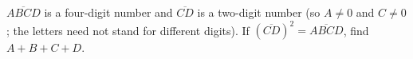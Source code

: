 $\overline{ABCD}$ is a four-digit number and $\overline{CD}$ is a two-digit number (so $A\ne0$ and $C\ne0$; the letters need not stand for different digits). If $\left(\overline{CD}\right)^2=\overline{ABCD}$, find $A+B+C+D$.
